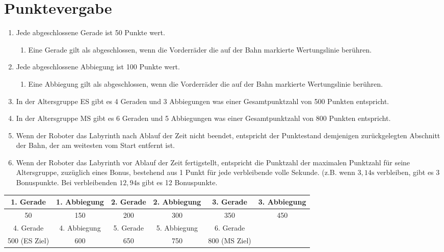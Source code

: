\documentclass[a4paper,12pt]{article}
\begin{document}
\section{Punktevergabe}
\begin{enumerate}
	\item Jede abgeschlossene Gerade ist 50 Punkte wert.
	\begin{enumerate}
		\item Eine Gerade gilt als abgeschlossen, wenn die Vorderräder
			die auf der Bahn markierte Wertungslinie berühren.
	\end{enumerate}
	\item Jede abgeschlossene Abbiegung ist 100 Punkte wert.
	\begin{enumerate}
		\item Eine Abbiegung gilt als abgeschlossen, wenn die
			Vorderräder die auf der Bahn markierte Wertungslinie
			berühren.
	\end{enumerate}
	\item In der Altersgruppe ES gibt es 4 Geraden und 3 Abbiegungen was
		einer Gesamtpunktzahl von 500 Punkten entspricht.
	\item In der Altersgruppe MS gibt es 6 Geraden und 5 Abbiegungen was
		einer Gesamtpunktzahl von 800 Punkten entspricht.
	\item Wenn der Roboter das Labyrinth nach Ablauf der Zeit nicht
		beendet, entspricht der Punktestand demjenigen zurückgelegten
		Abschnitt der Bahn, der am weitesten vom Start entfernt ist.
	\item Wenn der Roboter das Labyrinth vor Ablauf der Zeit fertigstellt,
		entspricht die Punktzahl der maximalen Punktzahl für seine
		Altersgruppe, zuzüglich eines Bonus, bestehend aus 1 Punkt für
		jede verbleibende volle Sekunde. (z.B. wenn $3,14\mathrm{s}$
		verbleiben, gibt es 3 Bonuspunkte. Bei verbleibenden
		$12,94\mathrm{s}$ gibt es 12 Bonuspunkte.
\end{enumerate}
\begin{center}
	\begin{tabular}{|c|c|c|c|c|c|} \hline
		\rowcolor{Gray}
		1. Gerade & 1. Abbiegung & 2. Gerade & 2. Abbiegung & 3. Gerade & 3. Abbiegung  \\ \hline
		50 & 150 & 200 & 300 & 350 & 450  \\ \hline
		\rowcolor{Gray}
		4. Gerade & 4. Abbiegung & 5. Gerade & 5. Abbiegung & 6. Gerade & \\ \hline
		500 (ES Ziel) & 600 & 650 & 750 & 800 (MS Ziel) & \\ \hline
	\end{tabular}
\end{center}
\end{document}
